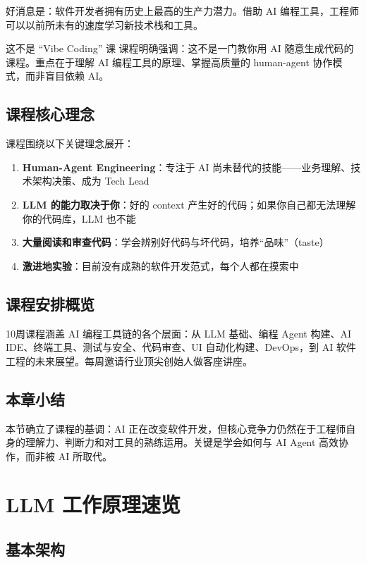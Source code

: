 \documentclass[a4paper]{article}
\begin{document}
好消息是：软件开发者拥有历史上最高的生产力潜力。借助 AI 编程工具，工程师可以以前所未有的速度学习新技术栈和工具。

\begin{warningbox}{这不是 ``Vibe Coding'' 课}
课程明确强调：这不是一门教你用 AI 随意生成代码的课程。重点在于理解 AI 编程工具的原理、掌握高质量的 human-agent 协作模式，而非盲目依赖 AI。
\end{warningbox}

\subsection{课程核心理念}

课程围绕以下关键理念展开：

\begin{enumerate}
    \item \textbf{Human-Agent Engineering}：专注于 AI 尚未替代的技能——业务理解、技术架构决策、成为 Tech Lead
    \item \textbf{LLM 的能力取决于你}：好的 context 产生好的代码；如果你自己都无法理解你的代码库，LLM 也不能
    \item \textbf{大量阅读和审查代码}：学会辨别好代码与坏代码，培养``品味''（taste）
    \item \textbf{激进地实验}：目前没有成熟的软件开发范式，每个人都在摸索中
\end{enumerate}

\subsection{课程安排概览}

10周课程涵盖 AI 编程工具链的各个层面：从 LLM 基础、编程 Agent 构建、AI IDE、终端工具、测试与安全、代码审查、UI 自动化构建、DevOps，到 AI 软件工程的未来展望。每周邀请行业顶尖创始人做客座讲座。

\subsection{本章小结}

本节确立了课程的基调：AI 正在改变软件开发，但核心竞争力仍然在于工程师自身的理解力、判断力和对工具的熟练运用。关键是学会如何与 AI Agent 高效协作，而非被 AI 所取代。

\section{LLM 工作原理速览}

\subsection{基本架构}
\end{document}
